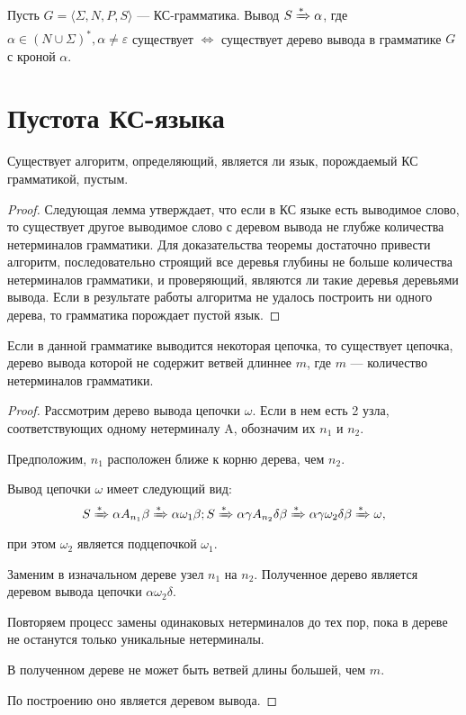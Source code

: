 \begin{theorem}
  Пусть $G = \langle \Sigma, N, P, S \rangle$ --- КС-грамматика.
  Вывод $S \xRightarrow[]{*} \alpha$, где $\alpha \in (N \cup \Sigma)^*, \alpha \neq \varepsilon$ существует $\Leftrightarrow$ существует дерево вывода в грамматике $G$ с кроной $\alpha$.
\end{theorem}

\section{Пустота КС-языка}

\begin{theorem}
  Существует алгоритм, определяющий, является ли язык, порождаемый КС грамматикой, пустым.
\end{theorem}

\begin{proof}
  Следующая лемма утверждает, что если в КС языке есть выводимое слово, то существует другое выводимое слово с деревом вывода не глубже количества нетерминалов грамматики.
  Для доказательства теоремы достаточно привести алгоритм, последовательно строящий все деревья глубины не больше количества нетерминалов грамматики, и проверяющий, являются ли такие деревья деревьями вывода.
  Если в результате работы алгоритма не удалось построить ни одного дерева, то грамматика порождает пустой язык.
\end{proof}

\begin{lemma}
  Если в данной грамматике выводится некоторая цепочка, то существует цепочка, дерево вывода которой не содержит ветвей длиннее $m$, где $m$ --- количество нетерминалов грамматики.
\end{lemma}

\begin{proof}
  Рассмотрим дерево вывода цепочки $\omega$. Если в нем есть 2 узла, соответствующих одному нетерминалу A, обозначим их $n_1$ и $n_2$.

  Предположим, $n_1$ расположен ближе к корню дерева, чем $n_2$.

  Вывод цепочки $\omega$ имеет следующий вид:
  \[S \xRightarrow[]{*} \alpha A_{n_1} \beta \xRightarrow[]{*} \alpha \omega_1 \beta; S \xRightarrow[]{*} \alpha \gamma A_{n_2} \delta \beta \xRightarrow[]{*} \alpha \gamma \omega_2 \delta \beta \xRightarrow[]{*} \omega,\]
  при этом $\omega_2$ является подцепочкой $\omega_1$.

  Заменим в изначальном дереве узел $n_1$ на $n_2$. Полученное дерево является деревом вывода цепочки $\alpha \omega_2 \delta$.

  Повторяем процесс замены одинаковых нетерминалов до тех пор, пока в дереве не останутся только уникальные нетерминалы.

  В полученном дереве не может быть ветвей длины большей, чем $m$.

  По построению оно является деревом вывода.
\end{proof}


